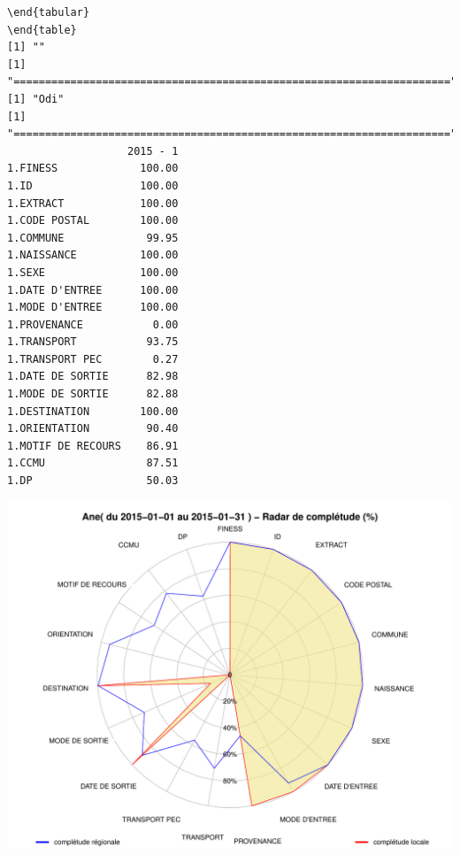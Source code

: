 \documentclass[]{article}
\begin{document}
\begin{verbatim}
\end{tabular} 
\end{table} 
[1] ""
[1] "====================================================================="
[1] "Odi"
[1] "====================================================================="
                   2015 - 1
1.FINESS             100.00
1.ID                 100.00
1.EXTRACT            100.00
1.CODE POSTAL        100.00
1.COMMUNE             99.95
1.NAISSANCE          100.00
1.SEXE               100.00
1.DATE D'ENTREE      100.00
1.MODE D'ENTREE      100.00
1.PROVENANCE           0.00
1.TRANSPORT           93.75
1.TRANSPORT PEC        0.27
1.DATE DE SORTIE      82.98
1.MODE DE SORTIE      82.88
1.DESTINATION        100.00
1.ORIENTATION         90.40
1.MOTIF DE RECOURS    86.91
1.CCMU                87.51
1.DP                  50.03
\end{verbatim}

\includegraphics{completude_files/figure-latex/finess-15.pdf}
\end{document}
